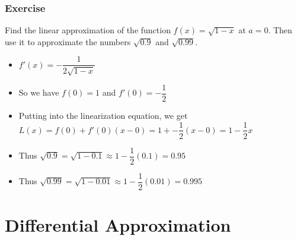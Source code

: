 \documentclass[t]{beamer}
\theoremstyle{plain}
\theoremstyle{definition}
\begin{document}
\begin{frame}

\frametitle{Exercise}

Find the linear approximation of the function $f(x) = \sqrt{1-x}$ at $a=0$.  Then use it to approximate the numbers $\sqrt{0.9}$ and $\sqrt{0.99}$.  \pause

\begin{itemize}
	\item $f'(x) =- \dfrac{1}{2\sqrt{1-x}}$
	\item So we have $f(0) = 1$ and $f'(0) = -\dfrac{1}{2}$
	\item Putting into the linearization equation, we get $L(x) = f(0) + f'(0)(x-0) = 1 + -\dfrac{1}{2}(x-0) = 1 - \dfrac{1}{2}x$
	\item Thus $\sqrt{0.9} = \sqrt{1-0.1} \approx1 - \dfrac{1}{2}(0.1) = 0.95$
	\item Thus $\sqrt{0.99} = \sqrt{1-0.01} \approx1 - \dfrac{1}{2}(0.01) = 0.995$
\end{itemize}

\end{frame}

\section{Differential Approximation}
\end{document}
